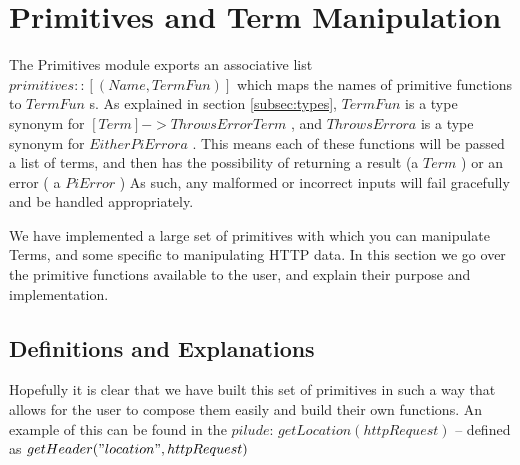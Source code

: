 \section{Primitives and Term Manipulation}
\label{sec:primitives}

The Primitives module exports an associative list $primitives :: [(Name,TermFun)]$ which maps the names of primitive functions to $TermFun$ s. As explained in section \ref{subsec:types}, $TermFun$ is a type synonym for $[Term] -> ThrowsError Term$ , and $ThrowsError a$ is a type synonym for $Either PiError a$ . This means each of these functions will be passed a list of terms, and then has the possibility of returning a result (a $Term$ ) or an error ( a $PiError$ )
As such, any malformed or incorrect inputs will fail gracefully and be handled appropriately.

We have implemented a large set of primitives with which you can manipulate Terms, and some specific to manipulating HTTP data. In this section we go over the primitive functions available to the user, and explain their purpose and implementation.
 
\subsection{Definitions and Explanations}



Hopefully it is clear that we have built this set of primitives in such a way that allows for the user to compose them easily and build their own functions. An example of this can be found in the $pilude$: $getLocation(httpRequest)$ -- defined as $getHeader("location",httpRequest)$
